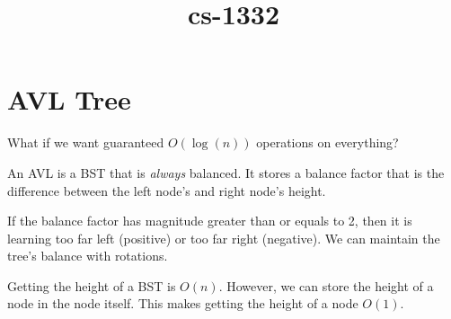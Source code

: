 \documentclass[a4paper]{article}
\title{cs-1332}
\begin{document}
    \maketitle
    \tableofcontents{}
















\section{AVL Tree}

What if we want guaranteed \( O(\log(n)) \) operations on everything?
\begin{definition}
	An AVL is a BST that is \textit{always} balanced. It stores a balance factor that is the difference between the left node's and right node's height.
\end{definition}

If the balance factor has magnitude greater than or equals to 2, then it is learning too far left (positive) or too far right (negative). We can maintain the tree's balance with rotations.

\begin{note}
	Getting the height of a BST is \( O(n) \). However, we can store the height of a node in the node itself. This makes getting the height of a node \( O(1) \).
\end{note}
\end{document}
